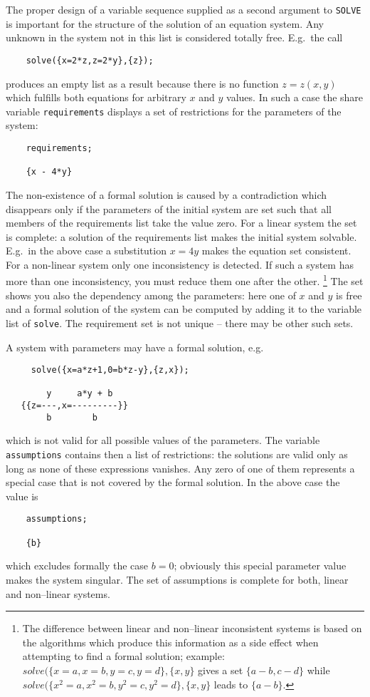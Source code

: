 The proper design of a variable sequence
supplied as a second argument to {\tt SOLVE} is important
for the structure of the solution of an equation system.
Any unknown in the system
not in this list is considered totally free. E.g.\  the call
\begin{verbatim}
    solve({x=2*z,z=2*y},{z});
\end{verbatim}
produces an empty list as a result because there is no function
$z=z(x,y)$ which fulfills both equations for arbitrary $x$ and $y$ values.
\hypertarget{reserved:requirements}{}
In such a case the share variable {\tt requirements}
displays a set of restrictions for the parameters of the system:
\begin{verbatim}
    requirements;

    {x - 4*y}
\end{verbatim}
The non-existence of a formal solution is caused by a 
contradiction which disappears only if the parameters
of the initial system are set such that all members
of the requirements list take the value zero.
For a linear system the set is complete: a solution
of the requirements list makes the initial
system solvable. E.g.\  in the above case a substitution
$x=4y$ makes the equation set consistent. For a non-linear
system only one inconsistency is detected. If such a system
has more than one inconsistency, you must reduce them
one after the other. 
\footnote{
The difference between linear and non--linear
inconsistent systems is based on the algorithms which
produce this information as a side effect when attempting
to find a formal solution; example:
$solve(\{x=a,x=b,y=c,y=d\},\{x,y\}$ gives a set $\{a-b,c-d\}$
while $solve(\{x^2=a,x^2=b,y^2=c,y^2=d\},\{x,y\}$ leads to $\{a-b\}$.
}
The  set shows you also the dependency among the parameters: here
one of $x$ and $y$ is free and a formal solution of the system can be
computed by adding it to the variable list of {\tt solve}. 
The requirement set is not unique -- there may be other such sets.


A system  with parameters may have a formal solution, e.g.\
\begin{verbatim}
     solve({x=a*z+1,0=b*z-y},{z,x});

        y     a*y + b
   {{z=---,x=---------}}
        b        b
\end{verbatim}
which is not valid for all possible values of the parameters.
\hypertarget{reserved:assumptions}{}
The variable {\tt assumptions} contains then a list of
restrictions: the solutions are valid only as long
as none of these expressions vanishes. Any zero of one of them
represents a special case that is not covered by the
formal solution. In the above case the value is
\begin{verbatim}
    assumptions;

    {b}
\end{verbatim}
which excludes formally the case $b=0$; obviously this special 
parameter value makes the system singular. The set of assumptions
is complete for both, linear and non--linear systems.
    
